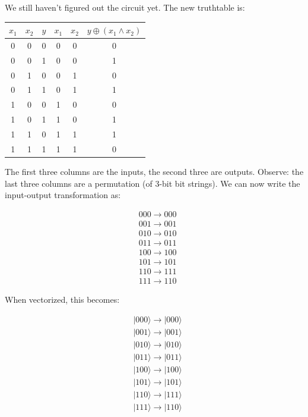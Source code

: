 \documentclass[main.tex]{subfiles}
\begin{document}
    We still haven't figured out the circuit yet. The new truthtable is:
    
    \begin{tabular}{|c|c|c|c|c|c|}
    \hline$x_{1}$ & $x_{2}$ & $y$ & $x_{1}$ & $x_{2}$ & $y \oplus\left(x_{1} \wedge x_{2}\right)$ \\
    \hline 0 & 0 & 0 & 0 & 0 & 0 \\
    0 & 0 & 1 & 0 & 0 & 1 \\
    0 & 1 & 0 & 0 & 1 & 0 \\
    0 & 1 & 1 & 0 & 1 & 1 \\
    1 & 0 & 0 & 1 & 0 & 0 \\
    1 & 0 & 1 & 1 & 0 & 1 \\
    1 & 1 & 0 & 1 & 1 & 1 \\
    1 & 1 & 1 & 1 & 1 & 0 \\
    \hline
    \end{tabular}
    
    The first three columns are the inputs, the second three are outputs. Observe: the last three columns are a permutation (of 3-bit bit strings). We can now write the input-output transformation as:
    
    $$
    \begin{aligned}
    &000 \rightarrow 000 \\
    &001 \rightarrow 001 \\
    &010 \rightarrow 010 \\
    &011 \rightarrow 011 \\
    &100 \rightarrow 100 \\
    &101 \rightarrow 101 \\
    &110 \rightarrow 111 \\
    &111 \rightarrow 110
    \end{aligned}
    $$
    
    When vectorized, this becomes:
    
    $$
    \begin{aligned}
    &|000\rangle \rightarrow|000\rangle \\
    &|001\rangle \rightarrow|001\rangle \\
    &|010\rangle \rightarrow|010\rangle \\
    &|011\rangle \rightarrow|011\rangle \\
    &|100\rangle \rightarrow|100\rangle \\
    &|101\rangle \rightarrow|101\rangle \\
    &|110\rangle \rightarrow|111\rangle \\
    &|111\rangle \rightarrow|110\rangle
    \end{aligned}
    $$
    
\end{document}
